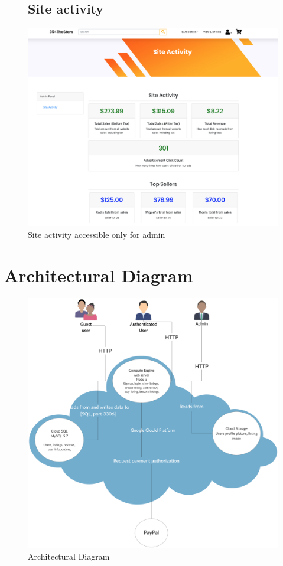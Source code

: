 \documentclass[11pt]{article}
\begin{document}
\begin{figure}[ht!]
    \subsection{Site activity}
    \centering
    \includegraphics[width=\textwidth,height=0.3\paperheight,keepaspectratio]{Diagrams/External_Interfaces/Site_Activity.png}
    \caption{Site activity accessible only for admin}
    \label{fig: Latest listings}
\end{figure}

\clearpage

\section{Architectural Diagram}
\begin{figure}[ht!]
    \centering
    \includegraphics[width=\textwidth,height=0.6\paperheight]{Diagrams/Class/Architectural_diagram.png}
    \caption{Architectural Diagram}
    \label{fig: Architectural Diagram}
\end{figure}
\end{document}
